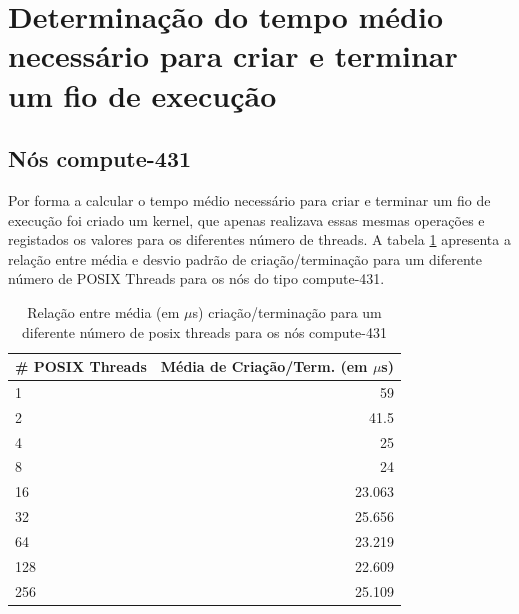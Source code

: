 \documentclass[conference,compsoc]{IEEEtran}
\begin{document}


\section{Determinação do tempo médio necessário para criar e  terminar um fio de execução}
\subsection{Nós compute-431}
Por forma a calcular o tempo médio necessário para criar e terminar um fio de execução foi criado um kernel, que apenas realizava essas mesmas operações e registados os valores para os diferentes número de threads. A tabela \ref{table:search_create} apresenta a relação entre média e desvio padrão de criação/terminação para um diferente número de POSIX Threads para os nós do tipo compute-431.


\begin{table}[H]
\caption{Relação entre média (em $\mu$s) criação/terminação para um diferente número de posix threads para os nós compute-431}
     \label{table:search_create}
\centering
  \begin{tabular}{ | l | r |   }
  
    \hline
    \# POSIX Threads & Média de Criação/Term.  (em $\mu$s)  \\ \hline 
    1      &     59 \\
            2 &        41.5 \\
            4   &        25\\
            8     &      24\\
           16    &   23.063\\
           32    &   25.656\\
           64    &   23.219\\
          128    &   22.609\\
          256    &   25.109\\
          
\hline 
  \end{tabular}
\end{table}
\end{document}
